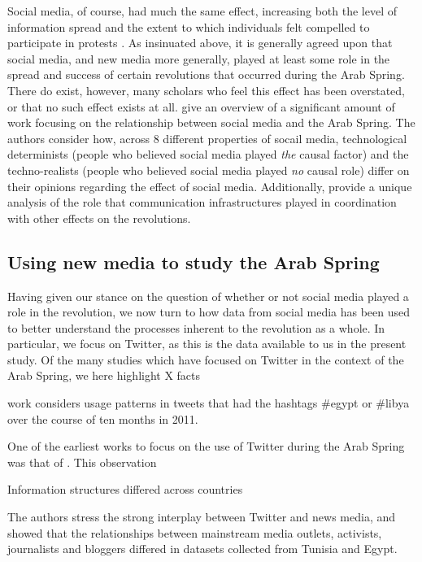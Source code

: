 Social media, of course, had much the same effect, increasing both the level of information spread and the extent to which individuals felt compelled to participate in protests \cite{tufekci_social_2012,wolfsfeld_social_2013,bellin_reconsidering_2012}. As insinuated above, it is generally agreed upon that social media, and new media more generally, played at least some role in the spread and success of certain revolutions that occurred during the Arab Spring.  There do exist, however, many scholars who feel this effect has been overstated, or that no such effect exists at all. \cite{comunello_will_2012} give an overview of a significant amount of work focusing on the relationship between social media and the Arab Spring.  The authors consider how, across 8 different properties of socail media, technological determinists (people who believed social media played \emph{the} causal factor) and the techno-realists (people who believed social media played \emph{no} causal role) differ on their opinions regarding the effect of social media.  Additionally, \cite{hussain_what_2013} provide a unique analysis of the role that communication infrastructures played in coordination with other effects on the revolutions.

\subsection{Using new media to study the Arab Spring}

Having given our stance on the question of whether or not social media played a role in the revolution, we now turn to how data from social media has been used to better understand the processes inherent to the revolution as a whole.  In particular, we focus on Twitter, as this is the data available to us in the present study.  Of the many studies which have focused on Twitter in the context of the Arab Spring, we here highlight X facts

\cite{bruns_arab_2013} work considers usage patterns in tweets that had the hashtags \#egypt or \#libya over the course of ten months in 2011.  

One of the earliest works to focus on the use of Twitter during the Arab Spring was that of \cite{lotan_revolutions_2011}. This observation 

Information structures differed across countries 

	\cite{lotan_revolutions_2011}
		 The authors stress the strong interplay between Twitter and news media, and showed that the relationships between mainstream media outlets, activists, journalists and bloggers differed in datasets collected from Tunisia and Egypt. 

